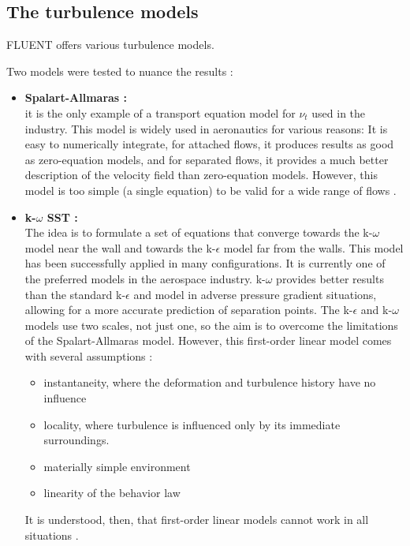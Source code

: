 
\subsection{The turbulence models}
\label{sub:Ch1.6.2}

FLUENT offers various turbulence models. 

Two models were tested to nuance the results :
\begin{itemize}
    \item \textbf{Spalart-Allmaras : } \\
    it is the only example of a transport equation model for $\nu_{t}$ used in the industry. This model is widely used in aeronautics for various reasons: It is easy to numerically integrate, for attached flows, it produces results as good as zero-equation models, and for separated flows, it provides a much better description of the velocity field than zero-equation models. However, this model is too simple (a single equation) to be valid for a wide range of flows \cite{turbulentmodels}.
    \item \textbf{k-$\omega$ SST : } \\
    The idea is to formulate a set of equations that converge towards the k-$\omega$ model near the wall and towards the k-$\epsilon$ model far from the walls. This model has been successfully applied in many configurations. It is currently one of the preferred models in the aerospace industry.
    k-$\omega$ provides better results than the standard k-$\epsilon$ and model in adverse pressure gradient situations, allowing for a more accurate prediction of separation points. The k-$\epsilon$ and k-$\omega$ models use two scales, not just one, so the aim is to overcome the limitations of the Spalart-Allmaras model.
    However, this first-order linear model comes with several assumptions :
    \begin{itemize}
        \item instantaneity, where the deformation and turbulence history have no influence
        \item locality, where turbulence is influenced only by its immediate surroundings.
        \item materially simple environment
        \item linearity of the behavior law
    \end{itemize}
    It is understood, then, that first-order linear models cannot work in all situations \cite{turbulentmodels}.
\end{itemize}

